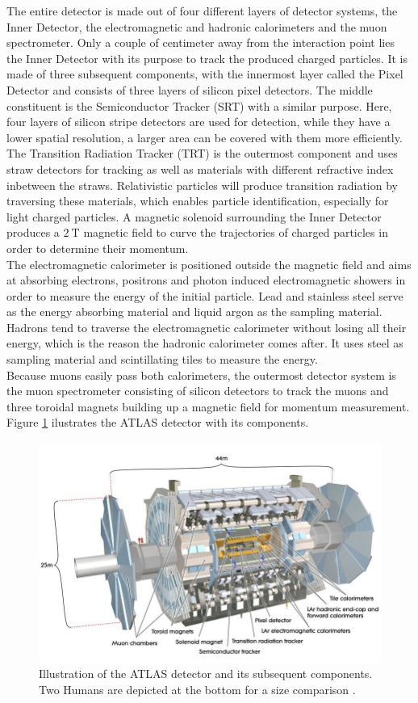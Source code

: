 The entire detector is made out of four different layers of detector systems, the Inner Detector, the electromagnetic and hadronic calorimeters
and the muon spectrometer. Only a couple of centimeter away from the interaction point lies the Inner Detector with its purpose to track the produced charged particles.
It is made of three subsequent components, with the innermost layer called the Pixel Detector and consists of three layers of silicon pixel detectors. The middle constituent
is the Semiconductor Tracker (SRT) with a similar purpose. Here, four layers of silicon stripe detectors are used for detection, while they have a lower spatial resolution, a larger
area can be covered with them more efficiently. The Transition Radiation Tracker (TRT) is the outermost component and uses straw detectors for tracking as well as materials with
different refractive index inbetween the straws. Relativistic particles will produce transition radiation by traversing these materials, which enables particle
identification, especially for light charged particles.
A magnetic solenoid surrounding the Inner Detector produces a $\SI{2}{\tesla}$ magnetic field to curve the trajectories of charged particles in order to determine their
momentum. \\
The electromagnetic calorimeter is positioned outside the magnetic field and aims at absorbing electrons, positrons and photon induced
electromagnetic showers in order to measure the energy of the initial particle. Lead and stainless steel serve as the energy absorbing material and liquid argon as the
sampling material. Hadrons tend to traverse the electromagnetic calorimeter without losing all their energy, which is the reason the hadronic calorimeter comes after.
It uses steel as sampling material and scintillating tiles to measure the energy. \\
Because muons easily pass both calorimeters, the outermost detector system is the muon spectrometer consisting of silicon detectors to track the muons and three toroidal magnets
building up a magnetic field for momentum measurement. Figure \ref{fig:atlas} ilustrates the ATLAS detector with its components.

\begin{figure}
  \centering
  \includegraphics[height=0.5\textwidth]{images/atlas.png}
  \caption{Illustration of the ATLAS detector and its subsequent components. Two Humans are depicted at the bottom for a size comparison \cite{atlas}.}
  \label{fig:atlas}
\end{figure}

